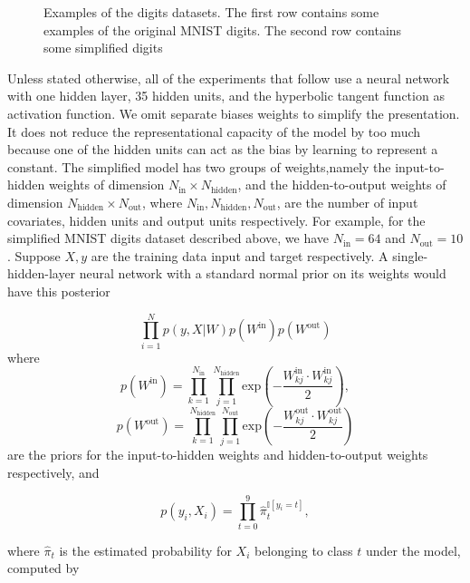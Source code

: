 \documentclass[12pt]{report}
\begin{document}
\begin{figure}
\begin{tcbraster}[raster columns=5, enhanced, blankest]

\end{tcbraster}
\caption{Examples of the digits datasets. The first row contains some examples of the original MNIST digits. The second row contains some simplified digits}
\end{figure}

Unless stated otherwise, all of the experiments that follow use a neural network with one hidden layer, 35 hidden units, and the hyperbolic tangent function as activation function. We omit separate biases weights to simplify the presentation. It does not reduce the representational capacity of the model by too much because one of the hidden units can act as the bias by learning to represent a constant. The simplified model has two groups of weights,namely the input-to-hidden weights of dimension $N_{\text{in}} \times N_{\text{hidden}}$, and the hidden-to-output weights of dimension $N_{\text{hidden}} \times N_{\text{out}} $, where $N_{\text{in}},N_{\text{hidden}},N_{\text{out}}$, are the number of input covariates, hidden units and output units respectively. For example, for the simplified MNIST digits dataset described above, we have $N_{\text{in}} = 64 $ and $N_{\text{out}} = 10 $. Suppose $X,y$ are the training data input and target respectively. A single-hidden-layer neural network with a standard normal prior on its weights would have this posterior 

\[ \prod_{i=1}^N p(y,X|W) p(W^{\text{in}})p(W^{\text{out}}) \]
where 
\[p(W^{\text{in}}) = \prod_{k=1}^{N_{\text{in}}}\prod_{j=1}^{N_{\text{hidden}}} \text{exp}(- \frac{W_{kj}^{\text{in}} \cdot W_{kj}^{\text{in}}}{2}), \]
\[p(W^{\text{out}}) = \prod_{k=1}^{N_{\text{hidden}}}\prod_{j=1}^{N_{\text{out}}} \text{exp}(- \frac{W_{kj}^{\text{out}} \cdot W_{kj}^{\text{out}}}{2}) \]
are the priors for the input-to-hidden weights and hidden-to-output weights respectively, and 

\[ p(y_i,X_i) = \prod_{t=0}^9 \hat{\pi}_t^{\mathbb{I}[y_i=t]}, \]

where $\hat{\pi}_t$ is the estimated probability for $X_i$ belonging to class $t$ under the model, computed by 
\end{document}
